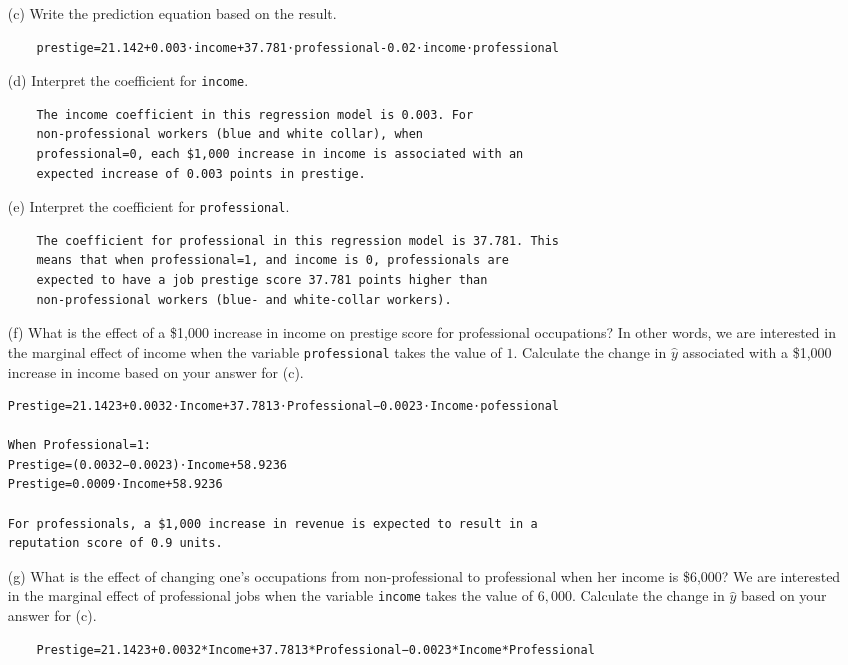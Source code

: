 \documentclass[12pt,letterpaper]{article}
\begin{document}
\begin{enumerate}
	\item [(c)]
	Write the prediction equation based on the result.
	\begin{verbatim} 
	prestige=21.142+0.003⋅income+37.781⋅professional-0.02⋅income⋅professional
    \end{verbatim}

	\item [(d)]
	Interpret the coefficient for \texttt{income}.
	\begin{verbatim}
	The income coefficient in this regression model is 0.003. For
	non-professional workers (blue and white collar), when 
	professional=0, each $1,000 increase in income is associated with an
	expected increase of 0.003 points in prestige.
    \end{verbatim}	

	\item [(e)]
	Interpret the coefficient for \texttt{professional}.
	\begin{verbatim}
	The coefficient for professional in this regression model is 37.781. This
	means that when professional=1, and income is 0, professionals are
	expected to have a job prestige score 37.781 points higher than
	non-professional workers (blue- and white-collar workers).
	\end{verbatim}	
	\newpage
	\item [(f)]
	What is the effect of a \$1,000 increase in income on prestige score for professional occupations? In other words, we are interested in the marginal effect of income when the variable \texttt{professional} takes the value of $1$. Calculate the change in $\hat{y}$ associated with a \$1,000 increase in income based on your answer for (c).
	\begin{verbatim}
Prestige=21.1423+0.0032⋅Income+37.7813⋅Professional−0.0023⋅Income⋅pofessional
     
When Professional=1:
Prestige=(0.0032−0.0023)⋅Income+58.9236
Prestige=0.0009⋅Income+58.9236
     
For professionals, a $1,000 increase in revenue is expected to result in a
reputation score of 0.9 units.
	\end{verbatim}
	
	\item [(g)]
	What is the effect of changing one's occupations from non-professional to professional when her income is \$6,000? We are interested in the marginal effect of professional jobs when the variable \texttt{income} takes the value of $6,000$. Calculate the change in $\hat{y}$ based on your answer for (c).
	\begin{verbatim}
	Prestige=21.1423+0.0032*Income+37.7813*Professional−0.0023*Income*Professional
	

\end{verbatim}
\end{enumerate}
\end{document}

